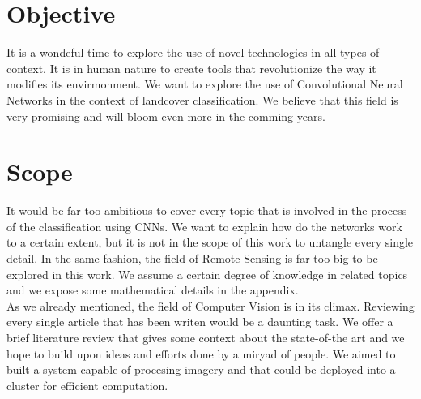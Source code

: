 \section{Objective}

It is a wondeful time to explore the use of novel technologies in all types of context. It is in human nature to create tools that revolutionize the way it modifies its envirmonment. We want to explore the use of Convolutional Neural Networks in the context of landcover classification. We believe that this field is very promising and will bloom even more in the comming years. 

\section{Scope}

It would be far too ambitious to cover every topic that is involved in the process of the classification using CNNs. We want to explain how do the networks work to a certain extent, but it is not in the scope of this work to untangle every single detail. In the same fashion, the field of Remote Sensing is far too big to be explored in this work. We assume a certain degree of knowledge in related topics and we expose some mathematical details in the appendix.\\

As we already mentioned, the field of Computer Vision is in its climax. Reviewing every single article that has been writen would be a daunting task. We offer a brief literature review that gives some context about the state-of-the art and we hope to build upon ideas and efforts done by a miryad of people. We aimed to built a system capable of procesing imagery and that could be deployed into a cluster for efficient computation.\\
